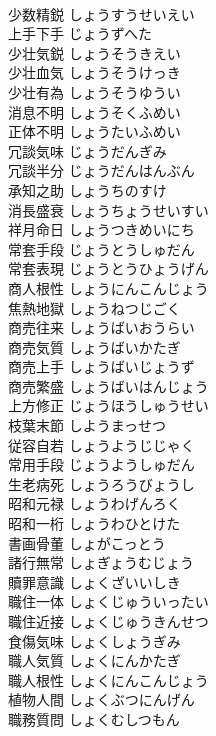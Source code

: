 \documentclass[8pt]{extreport}
\begin{document}
\begin{CJK}{UTF8}{min}
\\	少数精鋭	しょうすうせいえい	
\\	上手下手	じょうずへた	
\\	少壮気鋭	しょうそうきえい	
\\	少壮血気	しょうそうけっき	
\\	少壮有為	しょうそうゆうい	
\\	消息不明	しょうそくふめい	
\\	正体不明	しょうたいふめい	
\\	冗談気味	じょうだんぎみ	
\\	冗談半分	じょうだんはんぶん	
\\	承知之助	しょうちのすけ	
\\	消長盛衰	しょうちょうせいすい	
\\	祥月命日	しょうつきめいにち	
\\	常套手段	じょうとうしゅだん	
\\	常套表現	じょうとうひょうげん	
\\	商人根性	しょうにんこんじょう	
\\	焦熱地獄	しょうねつじごく	
\\	商売往来	しょうばいおうらい	
\\	商売気質	しょうばいかたぎ	
\\	商売上手	しょうばいじょうず	
\\	商売繁盛	しょうばいはんじょう	
\\	上方修正	じょうほうしゅうせい	
\\	枝葉末節	しようまっせつ	
\\	従容自若	しょうようじじゃく	
\\	常用手段	じょうようしゅだん	
\\	生老病死	しょうろうびょうし	
\\	昭和元禄	しょうわげんろく	
\\	昭和一桁	しょうわひとけた	
\\	書画骨董	しょがこっとう	
\\	諸行無常	しょぎょうむじょう	
\\	贖罪意識	しょくざいいしき	
\\	職住一体	しょくじゅういったい	
\\	職住近接	しょくじゅうきんせつ	
\\	食傷気味	しょくしょうぎみ	
\\	職人気質	しょくにんかたぎ	
\\	職人根性	しょくにんこんじょう	
\\	植物人間	しょくぶつにんげん	
\\	職務質問	しょくむしつもん	

\end{CJK}
\end{document}
